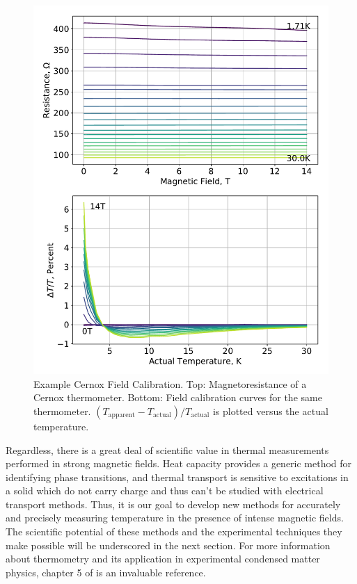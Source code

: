 \documentclass{thesis-umich}
\begin{document}
\begin{figure}
\centering
\includegraphics[width=\textwidth]{figures/cal_cernox_1.pdf}
\caption[Example Cernox Field Calibration]{Example Cernox Field Calibration. Top: Magnetoresistance of a
Cernox thermometer. Bottom: Field calibration curves for the same
thermometer.
\((T_{\mathrm{apparent}} - T_{\mathrm{actual}})/T_{\mathrm{actual}}\) is
plotted versus the actual temperature. \label{cernox_fieldcal}}
\end{figure}

Regardless, there is a great deal of scientific value in thermal
measurements performed in strong magnetic fields. Heat capacity provides
a generic method for identifying phase transitions, and thermal
transport is sensitive to excitations in a solid which do not carry
charge and thus can't be studied with electrical transport methods.
Thus, it is our goal to develop new methods for accurately and precisely
measuring temperature in the presence of intense magnetic fields. The
scientific potential of these methods and the experimental techniques
they make possible will be underscored in the next section. For more
information about thermometry and its application in experimental
condensed matter physics, chapter 5 of \cite{Ekin2006} is an invaluable
reference.
\end{document}
